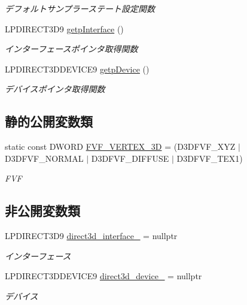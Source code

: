\begin{DoxyCompactItemize}
\begin{DoxyCompactList}\small\item\em デフォルトサンプラーステート設定関数 \end{DoxyCompactList}\item 
L\+P\+D\+I\+R\+E\+C\+T3\+D9 \mbox{\hyperlink{class_renderer_direct_x9_aad68389e45dd757dcde19d636f082a21}{getp\+Interface}} ()
\begin{DoxyCompactList}\small\item\em インターフェースポインタ取得関数 \end{DoxyCompactList}\item 
L\+P\+D\+I\+R\+E\+C\+T3\+D\+D\+E\+V\+I\+C\+E9 \mbox{\hyperlink{class_renderer_direct_x9_afabcea127b5af61e4d80564369e72baa}{getp\+Device}} ()
\begin{DoxyCompactList}\small\item\em デバイスポインタ取得関数 \end{DoxyCompactList}\end{DoxyCompactItemize}
\subsection*{静的公開変数類}
\begin{DoxyCompactItemize}
\item 
static const D\+W\+O\+RD \mbox{\hyperlink{class_renderer_direct_x9_a80ce0089b01354986332553353625da6}{F\+V\+F\+\_\+\+V\+E\+R\+T\+E\+X\+\_\+3D}} = (D3\+D\+F\+V\+F\+\_\+\+X\+YZ $\vert$ D3\+D\+F\+V\+F\+\_\+\+N\+O\+R\+M\+AL $\vert$ D3\+D\+F\+V\+F\+\_\+\+D\+I\+F\+F\+U\+SE $\vert$ D3\+D\+F\+V\+F\+\_\+\+T\+E\+X1)
\begin{DoxyCompactList}\small\item\em F\+VF \end{DoxyCompactList}\end{DoxyCompactItemize}
\subsection*{非公開変数類}
\begin{DoxyCompactItemize}
\item 
L\+P\+D\+I\+R\+E\+C\+T3\+D9 \mbox{\hyperlink{class_renderer_direct_x9_a1616ee343f701fe647ed8d1727c8229d}{direct3d\+\_\+interface\+\_\+}} = nullptr
\begin{DoxyCompactList}\small\item\em インターフェース \end{DoxyCompactList}\item 
L\+P\+D\+I\+R\+E\+C\+T3\+D\+D\+E\+V\+I\+C\+E9 \mbox{\hyperlink{class_renderer_direct_x9_aba9ae366d583e965418423ec76454a61}{direct3d\+\_\+device\+\_\+}} = nullptr
\begin{DoxyCompactList}\small\item\em デバイス \end{DoxyCompactList}\end{DoxyCompactItemize}


